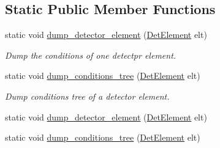 \subsection*{Static Public Member Functions}
\begin{DoxyCompactItemize}
\item 
static void \hyperlink{struct_d_d4hep_1_1_conditions_1_1_test_1_1_test_env_ab2a1c2b98a13f7f935e4aeb55dadf33a}{dump\+\_\+detector\+\_\+element} (\hyperlink{class_d_d4hep_1_1_geometry_1_1_det_element}{Det\+Element} elt)
\begin{DoxyCompactList}\small\item\em Dump the conditions of one detectpr element. \end{DoxyCompactList}\item 
static void \hyperlink{struct_d_d4hep_1_1_conditions_1_1_test_1_1_test_env_ad3463aa0bb52943b896e9410019d4a5f}{dump\+\_\+conditions\+\_\+tree} (\hyperlink{class_d_d4hep_1_1_geometry_1_1_det_element}{Det\+Element} elt)
\begin{DoxyCompactList}\small\item\em Dump conditions tree of a detector element. \end{DoxyCompactList}\item 
static void \hyperlink{struct_d_d4hep_1_1_conditions_1_1_test_1_1_test_env_aa21613eb3a5e779b69819c285344a2a7}{dump\+\_\+detector\+\_\+element} (\hyperlink{class_d_d4hep_1_1_geometry_1_1_det_element}{Det\+Element} elt)
\item 
static void \hyperlink{struct_d_d4hep_1_1_conditions_1_1_test_1_1_test_env_a1cabe62789776e1356609988fcb03442}{dump\+\_\+conditions\+\_\+tree} (\hyperlink{class_d_d4hep_1_1_geometry_1_1_det_element}{Det\+Element} elt)
\end{DoxyCompactItemize}
